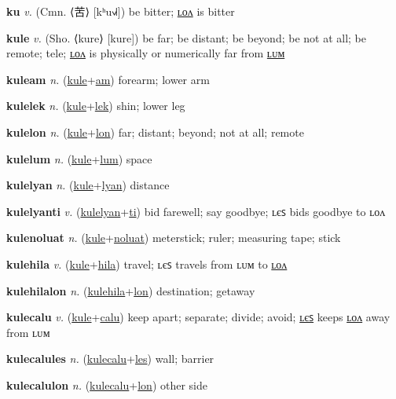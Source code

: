 \textbf{\hypertarget{ku}{ku}} \textit{v.} (Cmn. ⟨{\chinese{}苦}⟩ [kʰu˧˩˧])
be bitter; \hyperlink{kulon}{ʟᴏᴧ} is bitter

\textbf{\hypertarget{kule}{kule}} \textit{v.} (Sho. ⟨kure⟩ [kure])
be far; be distant; be beyond; be not at all; be remote; tele; \hyperlink{kulelon}{ʟᴏᴧ} is physically or numerically far from \hyperlink{kulelum}{ʟᴜᴍ}

\textbf{\hypertarget{kuleam}{kuleam}} \textit{n.} (\hyperlink{kule}{kule}+\allowbreak \hyperlink{am}{am})
forearm; lower arm

\textbf{\hypertarget{kulelek}{kulelek}} \textit{n.} (\hyperlink{kule}{kule}+\allowbreak \hyperlink{lek}{lek})
shin; lower leg

\textbf{\hypertarget{kulelon}{kulelon}} \textit{n.} (\hyperlink{kule}{kule}+\allowbreak \hyperlink{lon}{lon})
far; distant; beyond; not at all; remote

\textbf{\hypertarget{kulelum}{kulelum}} \textit{n.} (\hyperlink{kule}{kule}+\allowbreak \hyperlink{lum}{lum})
space

\textbf{\hypertarget{kulelyan}{kulelyan}} \textit{n.} (\hyperlink{kule}{kule}+\allowbreak \hyperlink{lyan}{lyan})
distance

\textbf{\hypertarget{kulelyanti}{kulelyanti}} \textit{v.} (\hyperlink{kulelyan}{kulelyan}+\allowbreak \hyperlink{ti}{ti})
bid farewell; say goodbye; ʟєꜱ bids goodbye to ʟᴏᴧ

\textbf{\hypertarget{kulenoluat}{kulenoluat}} \textit{n.} (\hyperlink{kule}{kule}+\allowbreak \hyperlink{noluat}{noluat})
meterstick; ruler; measuring tape; stick

\textbf{\hypertarget{kulehila}{kulehila}} \textit{v.} (\hyperlink{kule}{kule}+\allowbreak \hyperlink{hila}{hila})
travel; ʟєꜱ travels from ʟᴜᴍ to \hyperlink{kulehilalon}{ʟᴏᴧ}

\textbf{\hypertarget{kulehilalon}{kulehilalon}} \textit{n.} (\hyperlink{kulehila}{kulehila}+\allowbreak \hyperlink{lon}{lon})
destination; getaway

\textbf{\hypertarget{kulecalu}{kulecalu}} \textit{v.} (\hyperlink{kule}{kule}+\allowbreak \hyperlink{calu}{calu})
keep apart; separate; divide; avoid; \hyperlink{kulecalules}{ʟєꜱ} keeps \hyperlink{kulecalulon}{ʟᴏᴧ} away from ʟᴜᴍ

\textbf{\hypertarget{kulecalules}{kulecalules}} \textit{n.} (\hyperlink{kulecalu}{kulecalu}+\allowbreak \hyperlink{les}{les})
wall; barrier

\textbf{\hypertarget{kulecalulon}{kulecalulon}} \textit{n.} (\hyperlink{kulecalu}{kulecalu}+\allowbreak \hyperlink{lon}{lon})
other side

